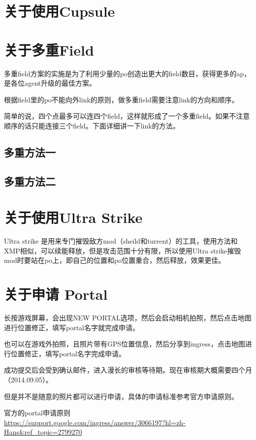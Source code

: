 \documentclass[a4paper]{article}
\begin{document}
\section{关于使用Cupsule}

\section{关于多重Field}
多重field方案的实施是为了利用少量的po创造出更大的field数目，获得更多的ap，是各位agent升级的最佳方案。\par
根据field里的po不能向外link的原则，做多重field需要注意link的方向和顺序。\par
简单的说，四个点最多可以连四个field，这样就形成了一个多重field。如果不注意顺序的话只能连接三个field。下面详细讲一下link的方法。\par
\subsection{多重方法一}

\subsection{多重方法二}

\section{关于使用Ultra Strike}
Ultra strike 是用来专门摧毁敌方mod（sheild和turrent）的工具，使用方法和XMP相似，可以续能释放，但是攻击范围十分有限，所以使用Ultra strike摧毁mod时要站在po上，即自己的位置和po位置重合，然后释放，效果更佳。

\section{关于申请 Portal}
长按游戏屏幕，会出现NEW PORTAL选项，然后会启动相机拍照，然后点击地图进行位置修正，填写portal名字就完成申请。\par
也可以在游戏外拍照，且照片带有GPS位置信息，然后分享到ingress，点击地图进行位置修正，填写portal名字完成申请。\par
成功提交后会受到确认邮件，进入漫长的审核等待期。现在审核期大概需要四个月（2014.09.05）。\par
但是并不是随意的照片都可以进行申请，具体的申请标准参考官方申请原则。\par
官方的portal申请原则\\
\url{https://support.google.com/ingress/answer/3066197?hl=zh-Hans&ref_topic=2799270}
\end{document}
